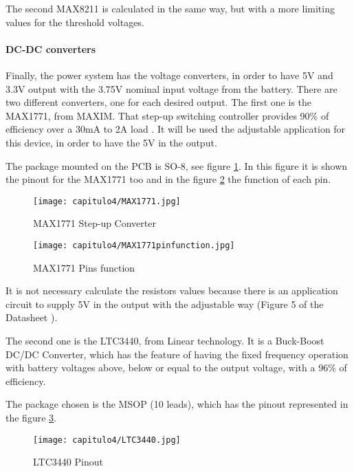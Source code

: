 The second MAX8211 is calculated in the same way, but with a more limiting values for the threshold voltages.


\paragraph{DC-DC converters} \label{DCconverters}

Finally, the power system has the voltage converters, in order to have 5V and 3.3V output with the 3.75V nominal input voltage from the battery.
 There are two different converters, one for each desired output. 
The first one is the MAX1771, from MAXIM. That step-up switching controller provides 90\% of efficiency over a 30mA to 2A load \cite{MAX1771}. It will be used the adjustable application for this device, in order to have the 5V in the output. 

The package mounted on the \acrshort{PCB} is SO-8, see figure \ref{fig:MAX1771}. In this figure it is shown the pinout for the MAX1771 too and in the figure \ref{fig:MAX1771pinfunction} the function of each pin.

\begin{figure}[H]
	\centering
		\texttt{[image: capitulo4/MAX1771.jpg]}
	\caption{ MAX1771 Step-up Converter}
	\label{fig:MAX1771}
\end{figure}


\begin{figure}[H]
	\centering
		\texttt{[image: capitulo4/MAX1771pinfunction.jpg]}
	\caption{ MAX1771 Pins function}
	\label{fig:MAX1771pinfunction}
\end{figure}

It is not necessary calculate the resistors values because there is an application circuit to supply 5V in the output with the adjustable way (Figure 5 of the Datasheet \cite{MAX1771}).

The second one is the LTC3440, from Linear technology. It is a Buck-Boost DC/DC Converter, which has the feature of having the fixed frequency operation with battery voltages above, below or equal to the output voltage, with a 96\% of efficiency. \cite{LTC}

The package chosen is the MSOP (10 leads), which has the pinout represented in the figure \ref{fig:LTC3440}.

\begin{figure}[H]
	\centering
		\texttt{[image: capitulo4/LTC3440.jpg]}
	\caption{ LTC3440 Pinout}
	\label{fig:LTC3440}
\end{figure}


